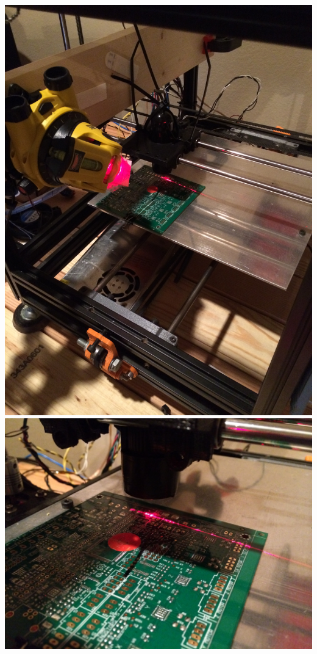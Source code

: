 \documentclass[12pt]{article}
\begin{document}
\includegraphics[scale=0.1,angle=270]{images/volume_analysis_setup/IMG_0605.JPG}
\includegraphics[scale=0.1,angle=270]{images/volume_analysis_setup/IMG_0606.JPG}
\end{document}
